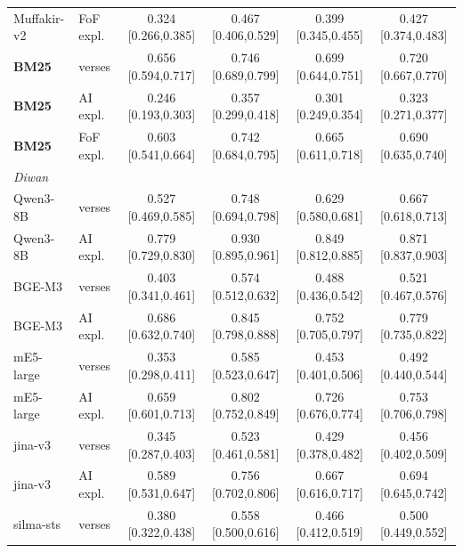 \begin{tabular}{ll cccc}
Muffakir-v2 & FoF expl. & 0.324 \scriptsize [0.266,0.385] & 0.467 \scriptsize [0.406,0.529] & 0.399 \scriptsize [0.345,0.455] & 0.427 \scriptsize [0.374,0.483] \\
\textbf{BM25} & verses & 0.656 \scriptsize [0.594,0.717] & 0.746 \scriptsize [0.689,0.799] & 0.699 \scriptsize [0.644,0.751] & 0.720 \scriptsize [0.667,0.770] \\
\textbf{BM25} & AI expl. & 0.246 \scriptsize [0.193,0.303] & 0.357 \scriptsize [0.299,0.418] & 0.301 \scriptsize [0.249,0.354] & 0.323 \scriptsize [0.271,0.377] \\
\textbf{BM25} & FoF expl. & 0.603 \scriptsize [0.541,0.664] & 0.742 \scriptsize [0.684,0.795] & 0.665 \scriptsize [0.611,0.718] & 0.690 \scriptsize [0.635,0.740] \\
\midrule
\multicolumn{6}{l}{\textit{Diwan}} \\
Qwen3-8B & verses & 0.527 \scriptsize [0.469,0.585] & 0.748 \scriptsize [0.694,0.798] & 0.629 \scriptsize [0.580,0.681] & 0.667 \scriptsize [0.618,0.713] \\
Qwen3-8B & AI expl. & 0.779 \scriptsize [0.729,0.830] & 0.930 \scriptsize [0.895,0.961] & 0.849 \scriptsize [0.812,0.885] & 0.871 \scriptsize [0.837,0.903] \\
BGE-M3 & verses & 0.403 \scriptsize [0.341,0.461] & 0.574 \scriptsize [0.512,0.632] & 0.488 \scriptsize [0.436,0.542] & 0.521 \scriptsize [0.467,0.576] \\
BGE-M3 & AI expl. & 0.686 \scriptsize [0.632,0.740] & 0.845 \scriptsize [0.798,0.888] & 0.752 \scriptsize [0.705,0.797] & 0.779 \scriptsize [0.735,0.822] \\
mE5-large & verses & 0.353 \scriptsize [0.298,0.411] & 0.585 \scriptsize [0.523,0.647] & 0.453 \scriptsize [0.401,0.506] & 0.492 \scriptsize [0.440,0.544] \\
mE5-large & AI expl. & 0.659 \scriptsize [0.601,0.713] & 0.802 \scriptsize [0.752,0.849] & 0.726 \scriptsize [0.676,0.774] & 0.753 \scriptsize [0.706,0.798] \\
jina-v3 & verses & 0.345 \scriptsize [0.287,0.403] & 0.523 \scriptsize [0.461,0.581] & 0.429 \scriptsize [0.378,0.482] & 0.456 \scriptsize [0.402,0.509] \\
jina-v3 & AI expl. & 0.589 \scriptsize [0.531,0.647] & 0.756 \scriptsize [0.702,0.806] & 0.667 \scriptsize [0.616,0.717] & 0.694 \scriptsize [0.645,0.742] \\
silma-sts & verses & 0.380 \scriptsize [0.322,0.438] & 0.558 \scriptsize [0.500,0.616] & 0.466 \scriptsize [0.412,0.519] & 0.500 \scriptsize [0.449,0.552] \\

\end{tabular}
